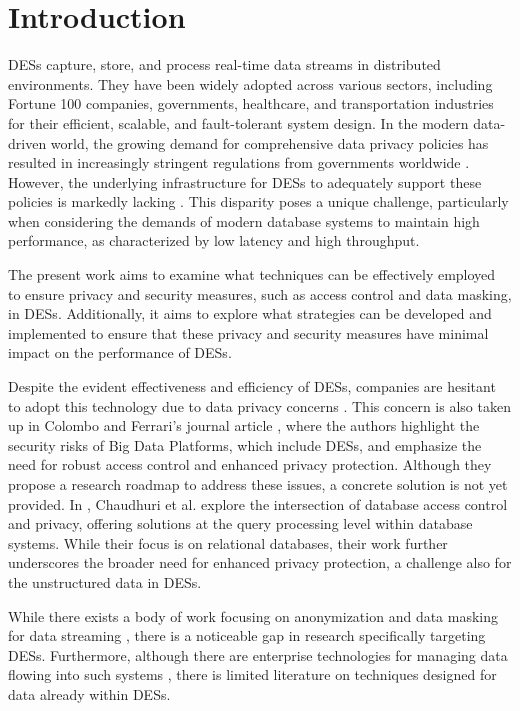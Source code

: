 \chapter{Introduction\label{cha:chapter1}}
\acfp{DES} capture, store, and process real-time data streams in distributed environments. They have been widely adopted across various sectors, including Fortune 100 companies, governments, healthcare, and transportation industries \cite{kafka} for their efficient, scalable, and fault-tolerant system design. In the modern data-driven world, the growing demand for comprehensive data privacy policies has resulted in increasingly stringent regulations from governments worldwide \cite{GDPR, CCPA}. However, the underlying infrastructure for \acp{DES} to adequately support these policies is markedly lacking \cite{Colombo2015}. This disparity poses a unique challenge, particularly when considering the demands of modern database systems to maintain high performance, as characterized by low latency and high throughput.\par
The present work aims to examine what techniques can be effectively employed to ensure privacy and security measures, such as access control and data masking, in \acp{DES}. Additionally, it aims to explore what strategies can be developed and implemented to ensure that these privacy and security measures have minimal impact on the performance of \acp{DES}. \par

Despite the evident effectiveness and efficiency of \acp{DES}, companies are hesitant to adopt this technology due to data privacy concerns \cite{Intel2012BigData}. This concern is also taken up in Colombo and Ferrari's journal article \cite{Colombo2015}, where the authors highlight the security risks of Big Data Platforms, which include \acp{DES}, and emphasize the need for robust access control and enhanced privacy protection. Although they propose a research roadmap to address these issues, a concrete solution is not yet provided. In \cite{chaudhuri2011database}, Chaudhuri et al. explore the intersection of database access control and privacy, offering solutions at the query processing level within database systems. While their focus is on relational databases, their work further underscores the broader need for enhanced privacy protection, a challenge also for the unstructured data in \acp{DES}. \par

While there exists a body of work focusing on anonymization and data masking for data streaming \cite{Cao2008, KIDS_zhang, anonymizing_IoT}, there is a noticeable gap in research specifically targeting \acp{DES}. 
Furthermore, although there are enterprise technologies for managing data flowing into such systems \cite{privitar}, there is limited literature on techniques designed for data already within \acp{DES}. \par

